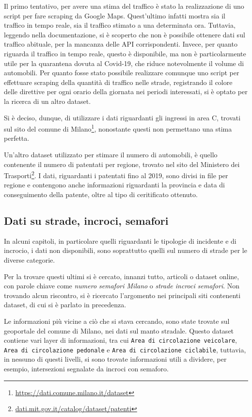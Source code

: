 \documentclass[a4paper,12pt]{report}
\newcommand{\columnstyle}[1]{\texttt{#1}}
\newcommand{\quotestyle}[1]{\textit{#1}}
\begin{document}
Il primo tentativo, per avere una stima del traffico è stato la realizzazione di uno 
script per fare scraping da Google Maps. 
Quest'ultimo infatti mostra sia il traffico in tempo reale, sia 
il traffico stimato a una determinata ora. 
Tuttavia, leggendo nella documentazione, si è scoperto che non è possibile ottenere 
dati sul traffico abituale, per la mancanza delle API corrispondenti. 
Invece, per quanto riguarda il traffico in tempo 
reale, questo è disponibile, ma non è particolarmente utile per la quarantena dovuta al 
Covid-19, che riduce notevolmente il volume di automobili. 
Per quanto fosse stato possibile realizzare comunque uno script per effettuare scraping della 
quantità di traffico nelle strade, registrando il colore delle direttive per ogni orario della 
giornata nei periodi interessati, si è optato per la ricerca di un altro dataset.

Si è deciso, dunque, di utilizzare i dati riguardanti gli ingressi in area C, 
trovati sul sito del comune di Milano\footnote{\url{https://dati.comune.milano.it/dataset}}, 
nonostante questi non permettano una stima perfetta.

Un'altro dataset utilizzato per stimare il numero di automobili, è quello contenente 
il numero di patentati per regione, trovato nel sito del Ministero dei 
Trasporti\footnote{\url{dati.mit.gov.it/catalog/dataset/patenti}}.
I dati, riguardanti i patentati fino al 2019, sono divisi in file per regione e 
contengono anche informazioni riguardanti la provincia e data di conseguimento della 
patente, oltre al tipo di ceritificato ottenuto.

\subsection{Dati su strade, incroci, semafori}

In alcuni capitoli, in particolare quelli riguardanti le tipologie di incidente e 
di incrocio, i dati non disponibili, sono soprattutto quelli sul 
numero di strade per le diverse categorie.

Per la trovare questi ultimi si è cercato, innanzi tutto, articoli o dataset online, con 
parole chiave come \quotestyle{numero semafori Milano} o \quotestyle{strade incroci semafori}.
Non trovando alcun riscontro, si è ricercato l'argomento nei principali siti contenenti 
dataset, di cui si è parlato in precedenza. 

Le informazioni più vicine a ciò che si stava cercando, sono state trovate sul geoportale 
del comune di Milano, nei dati sul manto stradale.
Questo dataset contiene vari layer di informazioni, tra cui 
\columnstyle{Area di circolazione veicolare}, 
\columnstyle{Area di circolazione pedonale} e \columnstyle{Area di circolazione ciclabile}, 
tuttavia, in nessuno di questi livelli, si sono trovate informazioni utili a dividere, 
per esempio, intersezioni segnalate da incroci con semaforo. 
\end{document}
